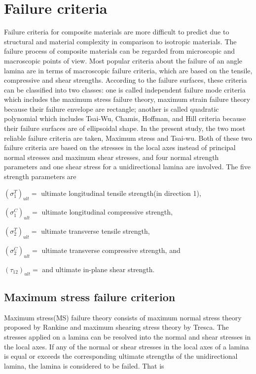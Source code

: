 \section{Failure criteria}
Failure criteria for composite materials are more difficult to predict due to
structural and material complexity in comparison to isotropic materials. The
failure process of composite materials can be regarded from microscopic and
macroscopic points of view. Most popular criteria about the failure of an angle
lamina are in terms of macroscopic failure criteria, which are based on the
tensile, compressive and shear strengths. According to the failure surfaces,
these criteria can be classified into two classes: one is called independent
failure mode criteria which includes the maximum stress failure theory, maximum
strain failure theory because their failure envelope are rectangle; another is
called quadratic polynomial which includes Tsai-Wu, Chamis, Hoffman, and Hill
criteria because their failure surfaces are of ellipsoidal shape. In the present
study, the two most reliable failure criteria are taken, Maximum stress and Tsai-wu.
Both of these two failure criteria are based on the stresses in the local axes
instead of principal normal stresses and maximum shear stresses, and four normal
strength parameters and one shear stress for a unidirectional lamina are
involved. The five strength parameters are

$(\sigma _1^{T})_{ult}= $ ultimate longitudinal tensile strength(in direction 1),

$(\sigma _1^{C})_{ult}= $ ultimate longitudinal compressive strength,

$(\sigma _2^{T})_{ult}= $ ultimate transverse tensile strength,

$(\sigma _2^{C})_{ult}= $ ultimate transverse compressive strength, and

$(\tau_{12})_{ult}= $ and ultimate in-plane shear strength.



\subsection{Maximum stress failure criterion}
Maximum stress(MS) failure theory consists of maximum normal stress theory
proposed by Rankine and maximum shearing stress theory by Tresca. The stresses
applied on a lamina can be resolved into the normal and shear stresses in the
local axes. If any of the normal or shear stresses in the local axes of a lamina
is equal or exceeds the corresponding ultimate strengths of the unidirectional
lamina, the lamina is considered to be failed. That is

